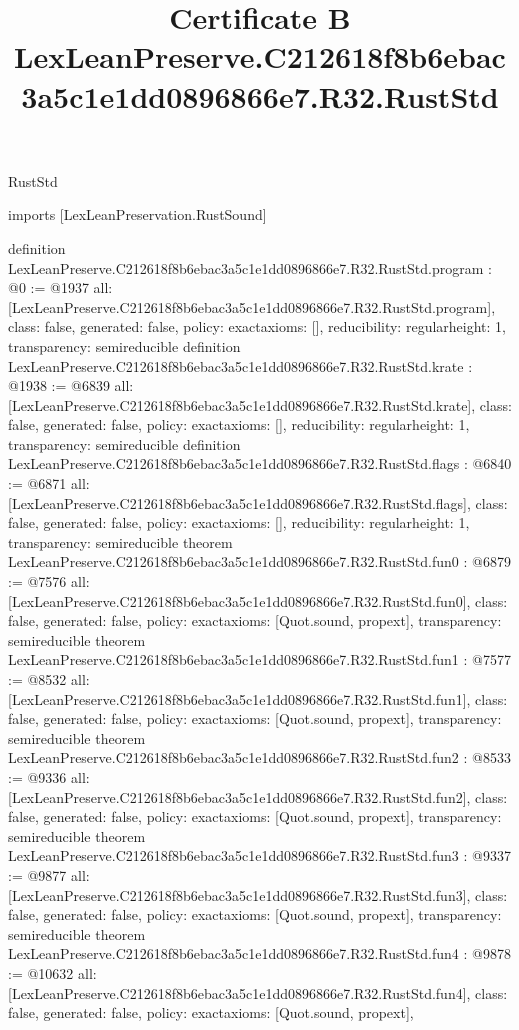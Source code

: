 \begin{lexlean}{RustStd}
\title{Certificate B LexLeanPreserve.C212618f8b6ebac3a5c1e1dd0896866e7.R32.RustStd}
\begin{coremodule}
imports [LexLeanPreservation.RustSound]

definition LexLeanPreserve.C212618f8b6ebac3a5c1e1dd0896866e7.R32.RustStd.program : @0 := @1937 {
  all: [LexLeanPreserve.C212618f8b6ebac3a5c1e1dd0896866e7.R32.RustStd.program],
  class: false,
  generated: false,
  policy: exact{axioms: []},
  reducibility: regular{height: 1},
  transparency: semireducible
}
definition LexLeanPreserve.C212618f8b6ebac3a5c1e1dd0896866e7.R32.RustStd.krate : @1938 := @6839 {
  all: [LexLeanPreserve.C212618f8b6ebac3a5c1e1dd0896866e7.R32.RustStd.krate],
  class: false,
  generated: false,
  policy: exact{axioms: []},
  reducibility: regular{height: 1},
  transparency: semireducible
}
definition LexLeanPreserve.C212618f8b6ebac3a5c1e1dd0896866e7.R32.RustStd.flags : @6840 := @6871 {
  all: [LexLeanPreserve.C212618f8b6ebac3a5c1e1dd0896866e7.R32.RustStd.flags],
  class: false,
  generated: false,
  policy: exact{axioms: []},
  reducibility: regular{height: 1},
  transparency: semireducible
}
theorem LexLeanPreserve.C212618f8b6ebac3a5c1e1dd0896866e7.R32.RustStd.fun0 : @6879 := @7576 {
  all: [LexLeanPreserve.C212618f8b6ebac3a5c1e1dd0896866e7.R32.RustStd.fun0],
  class: false,
  generated: false,
  policy: exact{axioms: [Quot.sound, propext]},
  transparency: semireducible
}
theorem LexLeanPreserve.C212618f8b6ebac3a5c1e1dd0896866e7.R32.RustStd.fun1 : @7577 := @8532 {
  all: [LexLeanPreserve.C212618f8b6ebac3a5c1e1dd0896866e7.R32.RustStd.fun1],
  class: false,
  generated: false,
  policy: exact{axioms: [Quot.sound, propext]},
  transparency: semireducible
}
theorem LexLeanPreserve.C212618f8b6ebac3a5c1e1dd0896866e7.R32.RustStd.fun2 : @8533 := @9336 {
  all: [LexLeanPreserve.C212618f8b6ebac3a5c1e1dd0896866e7.R32.RustStd.fun2],
  class: false,
  generated: false,
  policy: exact{axioms: [Quot.sound, propext]},
  transparency: semireducible
}
theorem LexLeanPreserve.C212618f8b6ebac3a5c1e1dd0896866e7.R32.RustStd.fun3 : @9337 := @9877 {
  all: [LexLeanPreserve.C212618f8b6ebac3a5c1e1dd0896866e7.R32.RustStd.fun3],
  class: false,
  generated: false,
  policy: exact{axioms: [Quot.sound, propext]},
  transparency: semireducible
}
theorem LexLeanPreserve.C212618f8b6ebac3a5c1e1dd0896866e7.R32.RustStd.fun4 : @9878 := @10632 {
  all: [LexLeanPreserve.C212618f8b6ebac3a5c1e1dd0896866e7.R32.RustStd.fun4],
  class: false,
  generated: false,
  policy: exact{axioms: [Quot.sound, propext]},
}
\end{coremodule}
\end{lexlean}
